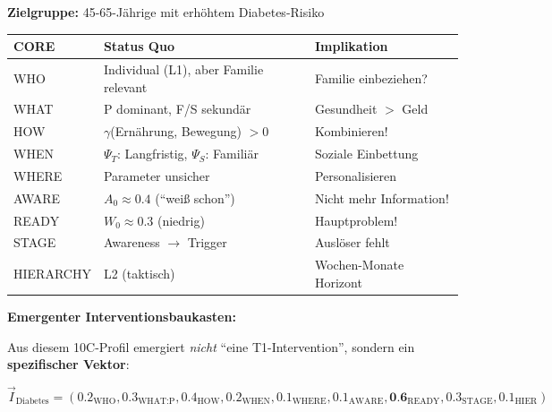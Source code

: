 \begin{tcolorbox}[colback=green!5!white, colframe=green!75!black,
    title=\textbf{10C Status Quo: Diabetes-Pr\"{a}vention}]

\textbf{Zielgruppe:} 45-65-J\"{a}hrige mit erh\"{o}htem Diabetes-Risiko

\begin{center}
\renewcommand{\arraystretch}{1.2}
\small
\begin{tabular}{@{}lll@{}}
\toprule
\textbf{CORE} & \textbf{Status Quo} & \textbf{Implikation} \\
\midrule
WHO & Individual (L1), aber Familie relevant & Familie einbeziehen? \\
WHAT & P dominant, F/S sekund\"{a}r & Gesundheit $>$ Geld \\
HOW & $\gamma$(Ern\"{a}hrung, Bewegung) $> 0$ & Kombinieren! \\
WHEN & $\Psi_T$: Langfristig, $\Psi_S$: Famili\"{a}r & Soziale Einbettung \\
WHERE & Parameter unsicher & Personalisieren \\
AWARE & $A_0 \approx 0.4$ (``wei\ss{} schon'') & Nicht mehr Information! \\
READY & $W_0 \approx 0.3$ (niedrig) & Hauptproblem! \\
STAGE & Awareness $\rightarrow$ Trigger & Ausl\"{o}ser fehlt \\
HIERARCHY & L2 (taktisch) & Wochen-Monate Horizont \\
\bottomrule
\end{tabular}
\end{center}

\end{tcolorbox}

\textbf{Emergenter Interventionsbaukasten:}

Aus diesem 10C-Profil emergiert \textit{nicht} ``eine T1-Intervention'', sondern ein \textbf{spezifischer Vektor}:

\begin{equation}
\vec{I}_{\text{Diabetes}} = (0.2_{\text{WHO}}, 0.3_{\text{WHAT:P}}, 0.4_{\text{HOW}}, 0.2_{\text{WHEN}}, 0.1_{\text{WHERE}}, 0.1_{\text{AWARE}}, \textbf{0.6}_{\text{READY}}, 0.3_{\text{STAGE}}, 0.1_{\text{HIER}})
\end{equation}

